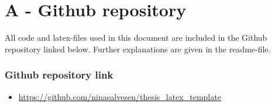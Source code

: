 
\chapter*{A - Github repository}
\label{Appendix: github repo}

All code and latex-files used in this document are included in the Github repository linked below. Further explanations are given in the readme-file. 


\subsection*{Github repository link}
\begin{itemize}
    \item \url{https://github.com/ninasalvesen/thesis_latex_template}
\end{itemize}
